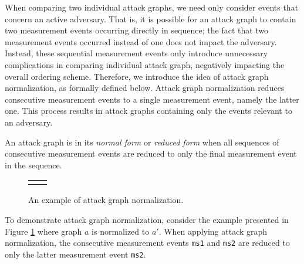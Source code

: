 \documentclass[runningheads]{llncs}
\theoremstyle{definition}
\begin{document}

When comparing two individual attack graphs, we need only consider events that concern an active adversary. That is, it is possible for an attack graph to contain two measurement events occurring directly in sequence; the fact that two measurement events occurred instead of one does not impact the adversary. Instead, these sequential measurement events only introduce unnecessary complications in comparing individual attack graph, negatively impacting the overall ordering scheme. Therefore, we introduce the idea of attack graph normalization, as formally defined below. Attack graph normalization reduces consecutive measurement events to a single measurement event, namely the latter one. This process results in attack graphs containing only the events relevant to an adversary. 

\begin{definition}
    An attack graph is in its \emph{normal form} or \emph{reduced form} when all sequences of consecutive measurement events are reduced to only the final measurement event in the sequence. 
\end{definition}

\begin{figure}[htbp]
    \centering 
    \begin{tabular}{c c}
         &  
    \end{tabular}
    \captionsetup{justification=centering,margin=1cm}
    \caption[Example of attack graph normalization]{An example of attack graph normalization.}
    \label{fig:reduce-ex}
\end{figure}
\noindent To demonstrate attack graph normalization, consider the example presented in Figure \ref{fig:reduce-ex} where graph $a$ is normalized to $a'$. When applying attack graph normalization, the consecutive measurement events \texttt{ms1} and \texttt{ms2} are reduced to only the latter measurement event \texttt{ms2}. 
\end{document}
